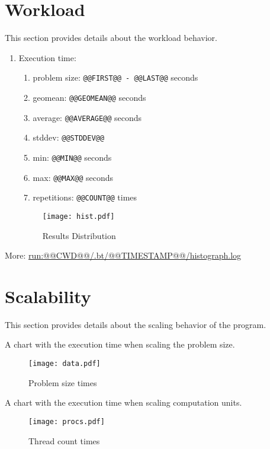 \documentclass[a4paper]{article}
\begin{document}
\section{Workload}

This section provides details about the workload behavior.

\begin{enumerate}
\item Execution time:
\begin{enumerate}
\item problem size: {\tt @@FIRST@@ - @@LAST@@} seconds
\item geomean: {\tt @@GEOMEAN@@} seconds
\item average: {\tt @@AVERAGE@@} seconds
\item stddev: {\tt @@STDDEV@@}
\item min: {\tt @@MIN@@} seconds
\item max: {\tt @@MAX@@} seconds
\item repetitions: {\tt @@COUNT@@} times
\end{enumerate}

\begin{figure}[H]
\label{fig:histogram}
\centering
\texttt{[image: hist.pdf]}
\caption{Results Distribution}
\end{figure}

\end{enumerate}

More: \url{run:@@CWD@@/.bt/@@TIMESTAMP@@/histograph.log}

\section{Scalability}

This section provides details about the scaling behavior of the program.

A chart with the execution time when scaling the problem size.

\begin{figure}[H]
\label{fig:scaling}
\centering
\texttt{[image: data.pdf]}
\caption{Problem size times}
\end{figure}

A chart with the execution time when scaling computation units.

\begin{figure}[H]
\label{fig:normal}
\centering
\texttt{[image: procs.pdf]}
\caption{Thread count times}
\end{figure}
\end{document}

